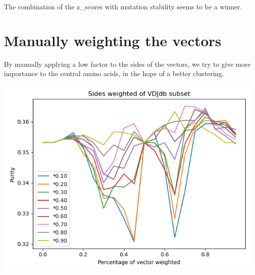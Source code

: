 \documentclass[11pt]{article}
\begin{document}
    \begin{figure}[H]
    \end{figure}

    The combination of the z\_scores with mutation stability seems to be a winner.

    \section{Manually weighting the vectors}

    By manually applying a low factor to the sides of the vectors, we try to give more
    importance to the central amino acids, in the hope of a better clustering.

    \begin{center}
        \includegraphics[width=0.8\linewidth]{img/weighting_manually.png}
    \end{center}
\end{document}
